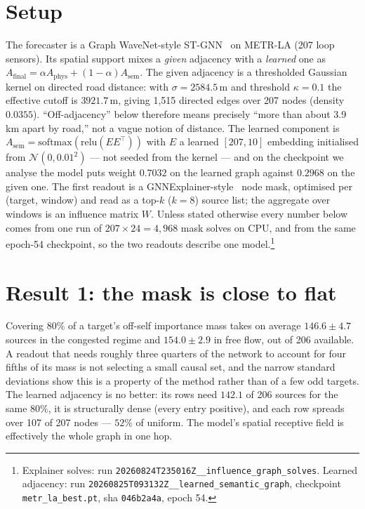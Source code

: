 \documentclass{article}
\begin{document}
\section{Setup}

The forecaster is a Graph WaveNet-style ST-GNN~\citep{gwnet2019} on METR-LA (207
loop sensors). Its spatial support mixes a \emph{given} adjacency with a
\emph{learned} one as $A_{\text{final}} = \alpha A_{\text{phys}} + (1-\alpha)
A_{\text{sem}}$. The given adjacency is a thresholded Gaussian kernel on directed
road distance: with $\sigma = 2584.5$\,m and threshold $\kappa = 0.1$ the effective
cutoff is $3921.7$\,m, giving 1{,}515 directed edges over 207 nodes (density
$0.0355$). ``Off-adjacency'' below therefore means precisely ``more than about
3.9\,km apart by road,'' not a vague notion of distance. The learned component is
$A_{\text{sem}} = \mathrm{softmax}(\mathrm{relu}(EE^\top))$ with $E$ a learned
$[207, 10]$ embedding initialised from $\mathcal{N}(0, 0.01^2)$ --- not seeded from
the kernel --- and on the checkpoint we analyse the model puts weight $0.7032$ on the
learned graph against $0.2968$ on the given one. The first readout is a
GNNExplainer-style~\citep{ying2019gnnexplainer} node mask, optimised per (target,
window) and read as a top-$k$ ($k{=}8$) source list; the aggregate over windows is
an influence matrix $W$. Unless stated otherwise every number below comes from one
run of $207 \times 24 = 4{,}968$ mask solves on CPU, and from the same epoch-54
checkpoint, so the two readouts describe one model.\footnote{Explainer solves: run
\texttt{20260824T235016Z\_\_influence\_\allowbreak graph\_solves}. Learned adjacency:
run \texttt{20260825T093132Z\_\_learned\_\allowbreak semantic\_graph}, checkpoint
\texttt{metr\_la\_best.pt}, sha \texttt{046b2a4a}, epoch 54.}

\section{Result 1: the mask is close to flat}

Covering $80\%$ of a target's off-self importance mass takes on average
$146.6 \pm 4.7$ sources in the congested regime and $154.0 \pm 2.9$ in free flow,
out of 206 available. A readout that needs roughly three quarters of the network to
account for four fifths of its mass is not selecting a small causal set, and the
narrow standard deviations show this is a property of the method rather than of a
few odd targets. The learned adjacency is no better: its rows need $142.1$ of 206
sources for the same $80\%$, it is structurally dense (every entry positive), and
each row spreads over 107 of 207 nodes --- $52\%$ of uniform. The model's spatial
receptive field is effectively the whole graph in one hop.
\end{document}
